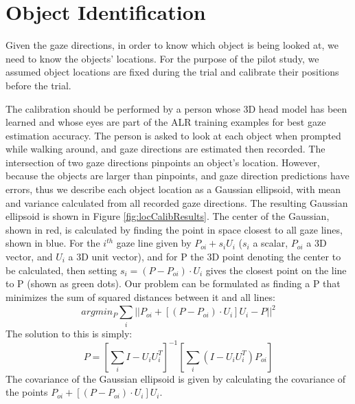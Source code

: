 \section{Object Identification}
Given the gaze directions, in order to know which object is being looked at, we need to know the objects' locations.  For the purpose of the pilot study, we assumed object locations are fixed during the trial and calibrate their positions before the trial.


The calibration should be performed by a person whose 3D head model has been learned and whose eyes are part of the ALR training examples for best gaze estimation accuracy.  The person is asked to look at each object when prompted while walking around, and gaze directions are estimated then recorded.  The intersection of two gaze directions pinpoints an object's location.  However, because the objects are larger than pinpoints, and gaze direction predictions have errors, thus we describe each object location as a Gaussian ellipsoid, with mean and variance calculated from all recorded gaze directions.  The resulting Gaussian ellipsoid is shown in Figure \ref{fig:locCalibResults}.  The center of the Gaussian, shown in red, is calculated by finding the point in space closest to all gaze lines, shown in blue.  For the \(i^{th}\) gaze line given by \(P_{oi} + s_i U_i\) (\(s_i\) a scalar, \(P_{oi}\) a 3D vector, and \(U_i\) a 3D unit vector), and for P the 3D point denoting the center to be calculated, then setting \(s_i = (P - P_{oi})\cdot{U_i} \) gives the closest point on the line to P (shown as green dots).  Our problem can be formulated as finding a P that minimizes the sum of squared distances between it and all lines:
\[ argmin_P \sum_{i}^{} || P_{oi} + [(P - P_{oi})\cdot{U_i}]U_i - P ||^2 \]
The solution to this is simply:
\[ P = [ \sum_{i}^{} I - U_i U_i^T ]^{-1}  [ \sum_{i}^{}(I - U_i U_i^T)P_{oi} ]   \]
The covariance of the Gaussian ellipsoid is given by calculating the covariance of the points \(P_{oi} + [(P - P_{oi})\cdot{U_i}]U_i\).
